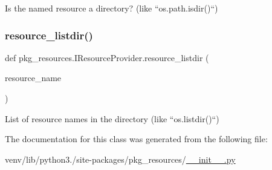 \begin{DoxyVerb}Is the named resource a directory?  (like ``os.path.isdir()``)\end{DoxyVerb}
 \mbox{\label{classpkg__resources_1_1IResourceProvider_a641c57dcce0cf87c1c58d64b4528d695}} 
\subsubsection{\texorpdfstring{resource\+\_\+listdir()}{resource\_listdir()}}
{\footnotesize\ttfamily def pkg\+\_\+resources.\+I\+Resource\+Provider.\+resource\+\_\+listdir (\begin{DoxyParamCaption}\item[{}]{resource\+\_\+name }\end{DoxyParamCaption})}

\begin{DoxyVerb}List of resource names in the directory (like ``os.listdir()``)\end{DoxyVerb}
 

The documentation for this class was generated from the following file\+:\begin{DoxyCompactItemize}
\item 
venv/lib/python3./site-\/packages/pkg\+\_\+resources/\hyperlink{venv_2lib_2python3_89_2site-packages_2pkg__resources_2____init_____8py}{\+\_\+\+\_\+init\+\_\+\+\_\+.\+py}\end{DoxyCompactItemize}
